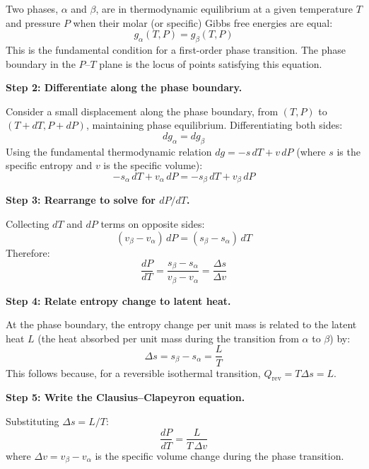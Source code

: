 Two phases, $\alpha$ and $\beta$, are in thermodynamic equilibrium at a given temperature $T$ and pressure $P$ when their molar (or specific) Gibbs free energies are equal:
\begin{equation}
g_\alpha(T, P) = g_\beta(T, P)
\end{equation}
This is the fundamental condition for a first-order phase transition. The phase boundary in the $P$--$T$ plane is the locus of points satisfying this equation.

\textbf{Step 2: Differentiate along the phase boundary.}

Consider a small displacement along the phase boundary, from $(T, P)$ to $(T + dT, P + dP)$, maintaining phase equilibrium. Differentiating both sides:
\begin{equation}
dg_\alpha = dg_\beta
\end{equation}
Using the fundamental thermodynamic relation $dg = -s\,dT + v\,dP$ (where $s$ is the specific entropy and $v$ is the specific volume):
\begin{equation}
-s_\alpha\,dT + v_\alpha\,dP = -s_\beta\,dT + v_\beta\,dP
\end{equation}

\textbf{Step 3: Rearrange to solve for $dP/dT$.}

Collecting $dT$ and $dP$ terms on opposite sides:
\begin{equation}
(v_\beta - v_\alpha)\,dP = (s_\beta - s_\alpha)\,dT
\end{equation}
Therefore:
\begin{equation}
\frac{dP}{dT} = \frac{s_\beta - s_\alpha}{v_\beta - v_\alpha} = \frac{\Delta s}{\Delta v}
\end{equation}

\textbf{Step 4: Relate entropy change to latent heat.}

At the phase boundary, the entropy change per unit mass is related to the latent heat $L$ (the heat absorbed per unit mass during the transition from $\alpha$ to $\beta$) by:
\begin{equation}
\Delta s = s_\beta - s_\alpha = \frac{L}{T}
\end{equation}
This follows because, for a reversible isothermal transition, $Q_{\text{rev}} = T\Delta s = L$.

\textbf{Step 5: Write the Clausius--Clapeyron equation.}

Substituting $\Delta s = L/T$:
\begin{equation}
\boxed{\frac{dP}{dT} = \frac{L}{T\,\Delta v}}
\end{equation}
where $\Delta v = v_\beta - v_\alpha$ is the specific volume change during the phase transition.

